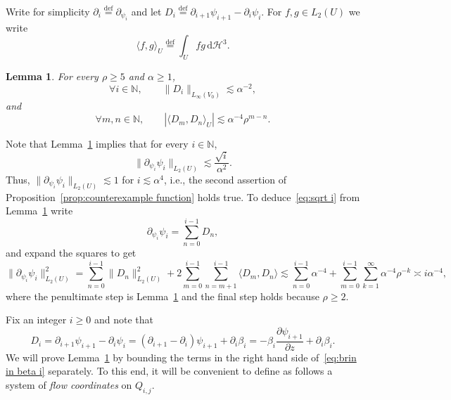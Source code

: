 \documentclass[11pt,reqno]{amsart}
\newcommand{\N}{\mathbb{N}}
\newcommand{\cH}{\mathcal{H}}
\newcommand{\ud}[0]{\,\mathrm{d}}
\newcommand{\0}{\mathbf{0}}
\renewcommand{\1}{\mathbf 1}
\newcommand{\eqdef}{\stackrel{\mathrm{def}}{=}}
\renewcommand{\ge}{\geqslant}
\newtheorem{lemma}[thm]{Lemma}
\theoremstyle{remark}
\begin{document}
Write for simplicity $\partial_i\eqdef \partial_{\psi_i}$ and let $D_i\eqdef \partial_{i+1} \psi_{i+1}-\partial_i \psi_i$. For $f,g\in L_2(U)$ we write
$$
\langle f,g\rangle_U\eqdef\int_U fg\ud \cH^3.
$$

\begin{lemma}\label{lem:alomost orthonormal} For every $\rho\ge 5$ and $\alpha\ge 1$,
$$
\forall  i\in \N,\qquad \|D_i\|_{L_\infty(V_0)}\lesssim \alpha^{-2},
$$
and
$$
\forall  m,n\in \N,\qquad |\langle D_m,D_n\rangle_U|\lesssim \alpha^{-4}\rho^{m-n}.
$$
\end{lemma}

Note that Lemma~\ref{lem:alomost orthonormal}  implies that for every $i\in \N$,
\begin{equation}\label{eq:sqrt i}
\|\partial_{\psi_i}\psi_i\|_{L_2(U)}\lesssim \frac{\sqrt{i}}{\alpha^2}.
\end{equation}
Thus, $\|\partial_{\psi_i}\psi_i\|_{L_2(U)}\lesssim 1$ for $i\lesssim \alpha^4$, i.e., the second assertion of Proposition~\ref{prop:counterexample function} holds true. To deduce~\eqref{eq:sqrt i} from  Lemma~\ref{lem:alomost orthonormal}  write
\begin{equation}\label{eq:telescoping D_m}
\partial_{\psi_i}\psi_i=\sum_{n=0}^{i-1}D_n,
\end{equation}
 and expand the squares to get
$$
\|\partial_{\psi_i}\psi_i\|_{L_2(U)}^2=\sum_{n=0}^{i-1} \|D_n\|_{L_2(U)}^2+2 \sum_{m=0}^{i-1}\sum_{n=m+1}^{i-1} \langle D_m,D_n\rangle\lesssim \sum_{n=0}^{i-1} \alpha^{-4}+\sum_{m=0}^{i-1}\sum_{k=1}^{\infty} \alpha^{-4}\rho^{-k}\asymp i\alpha^{-4},
$$
where the penultimate step is Lemma~\ref{lem:alomost orthonormal}  and the final step holds because $\rho\ge 2$.

Fix an integer $i\ge 0$ and note that
\begin{equation}\label{eq:brin in beta i}
D_i=\partial_{i+1} \psi_{i+1}-\partial_i \psi_i= (\partial_{i+1}-\partial_i) \psi_{i+1}+\partial_i \beta_i =-\beta_i \frac{\partial\psi_{i+1}}{\partial z}+\partial_i\beta_i.
\end{equation}
We will prove Lemma~\ref{lem:alomost orthonormal}  by bounding the terms in the right hand side of~\eqref{eq:brin in beta i} separately. To this end, it will be convenient to define as follows a system of {\em flow coordinates} on $Q_{i,j}$.
\end{document}
